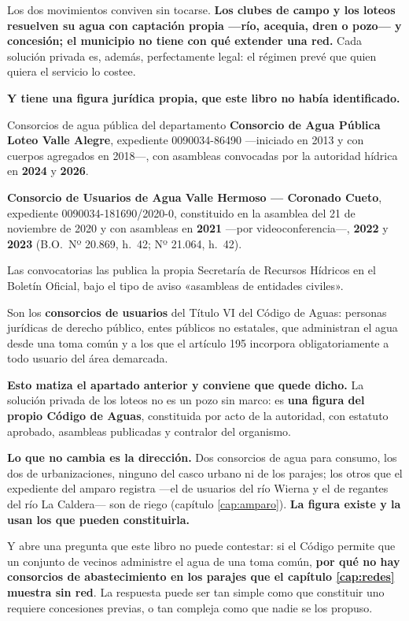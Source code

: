 Los dos movimientos conviven sin tocarse. \textbf{Los clubes de campo y los loteos resuelven su agua con
captación propia ---río, acequia, dren o pozo--- y concesión; el municipio no tiene con qué extender una red.} Cada solución
privada es, además, perfectamente legal: el régimen prevé que quien quiera el servicio lo
costee.

\textbf{Y tiene una figura jurídica propia, que este libro no había identificado.}

\begin{ficha}{Consorcios de agua pública del departamento}
\textbf{Consorcio de Agua Pública Loteo Valle Alegre}, expediente 0090034-86490 ---iniciado en
2013 y con cuerpos agregados en 2018---, con asambleas convocadas por la autoridad hídrica en
\textbf{2024} y \textbf{2026}.

\textbf{Consorcio de Usuarios de Agua Valle Hermoso --- Coronado Cueto}, expediente
0090034-181690/2020-0, constituido en la asamblea del 21 de noviembre de 2020 y con asambleas en \textbf{2021} ---por videoconferencia---, \textbf{2022} y \textbf{2023} (B.O.\ Nº 20.869, h.\ 42; Nº 21.064, h.\ 42).

Las convocatorias las publica la propia Secretaría de Recursos Hídricos en el Boletín Oficial,
bajo el tipo de aviso «asambleas de entidades civiles».
\end{ficha}

Son los \textbf{consorcios de usuarios} del Título VI del Código de Aguas: personas jurídicas
de derecho público, entes públicos no estatales, que administran el agua desde una toma común
y a los que el artículo 195 incorpora obligatoriamente a todo usuario del área demarcada.

\begin{cautela}
\textbf{Esto matiza el apartado anterior y conviene que quede dicho.} La solución privada de
los loteos no es un pozo sin marco: es \textbf{una figura del propio Código de Aguas},
constituida por acto de la autoridad, con estatuto aprobado, asambleas publicadas y contralor
del organismo.

\textbf{Lo que no cambia es la dirección.} Dos consorcios de agua para consumo, los dos de urbanizaciones, ninguno del casco urbano ni de los parajes; los otros que el expediente del amparo registra ---el de usuarios del río Wierna y el de regantes del río La Caldera--- son de riego (capítulo \ref{cap:amparo}). \textbf{La figura existe y la usan
los que pueden constituirla.}

Y abre una pregunta que este libro no puede contestar: si el Código permite que un conjunto de
vecinos administre el agua de una toma común, \textbf{por qué no hay consorcios de abastecimiento en los parajes
que el capítulo \ref{cap:redes} muestra sin red}. La respuesta puede ser tan simple como que
constituir uno requiere concesiones previas, o tan compleja como que nadie se los propuso.
\end{cautela}

